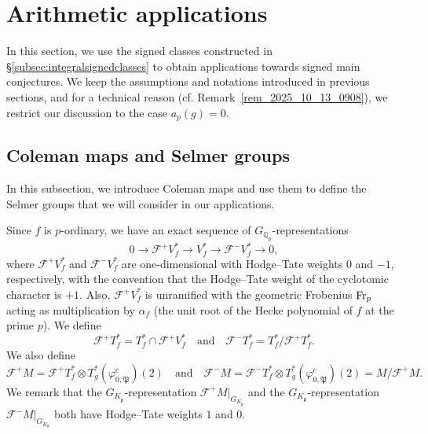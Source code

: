 \documentclass{amsart}
\numberwithin{equation}{section}
\newcommand{\bb}{\mathbb}
\newcommand{\frk}{\mathfrak}
\newcommand{\Fr}{{\rm Fr}}
\begin{document}
\section{Arithmetic applications}
\label{sec:applications}
In this section, we use the signed classes constructed in \S\ref{subsec:integralsignedclasses} to obtain applications towards signed main conjectures. We keep the assumptions and notations introduced in previous sections, and for a technical reason (cf. Remark~\ref{rem_2025_10_13_0908}), we restrict our discussion to the case $a_p(g)=0$. 

\subsection{Coleman maps and Selmer groups}
\label{subsec_5_1_2025_11_02_1128}
In this subsection, we introduce Coleman maps and use them to define the Selmer groups that we will consider in our applications. 

Since $f$ is $p$-ordinary, we have an exact sequence of $G_{\bb{Q}_p}$-representations
\[
0\rightarrow \mathscr{F}^+V_f^\ast\rightarrow V_f^\ast \rightarrow \mathscr{F}^- V_f^\ast\rightarrow 0,
\]
where $\mathscr{F}^+V_f^\ast$ and $\mathscr{F}^-V_f^\ast$ are one-dimensional with Hodge--Tate weights $0$ and $-1$, respectively, with the convention that the Hodge--Tate weight of the cyclotomic character is $+1$. Also, $\mathscr{F}^+V_f^\ast$ is unramified with the geometric Frobenius $\Fr_p$ acting as multiplication by $\alpha_f$ (the unit root of the Hecke polynomial of $f$ at the prime $p$). We define
\[
\mathscr{F}^+T_f^\ast=T_f^\ast\cap \mathscr{F}^+V_f^\ast \quad \text{and} \quad \mathscr{F}^-T_f^\ast=T_f^\ast/\mathscr{F}^+T_f^\ast.
\]
We also define
\[
\mathscr{F}^+M=\mathscr{F}^+T_f^\ast\otimes T_g^\ast(\varphi_{0,\frk{P}}^c)(2) \quad \text{and} \quad \mathscr{F}^-M=\mathscr{F}^-T_f^\ast\otimes T_g^\ast(\varphi_{0,\frk{P}}^c)(2)=M/\mathscr{F}^+M.
\]
We remark that the $G_{K_{\overline{\frk{p}}}}$-representation $\mathscr{F}^+M\vert_{G_{K_{\overline{\frk{p}}}}}$ and the $G_{K_{\frk{p}}}$-representation $\mathscr{F}^-M\vert_{G_{K_{\frk{p}}}}$ both have Hodge–Tate weights $1$ and $0$.
\end{document}
